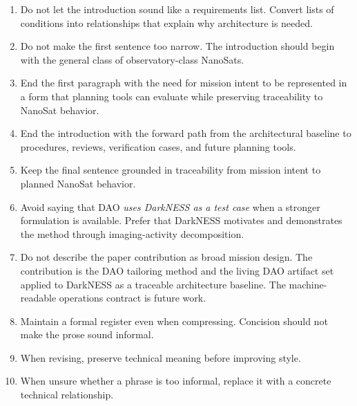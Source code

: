 \documentclass[11pt]{article}
\begin{document}
\begin{enumerate}
\item Do not let the introduction sound like a requirements list. Convert lists of conditions into relationships that explain why architecture is needed.

\item Do not make the first sentence too narrow. The introduction should begin with the general class of observatory-class NanoSats.

\item End the first paragraph with the need for mission intent to be represented in a form that planning tools can evaluate while preserving traceability to NanoSat behavior.

\item End the introduction with the forward path from the architectural baseline to procedures, reviews, verification cases, and future planning tools.

\item Keep the final sentence grounded in traceability from mission intent to planned NanoSat behavior.

\item Avoid saying that DAO \emph{uses DarkNESS as a test case} when a stronger formulation is available. Prefer that DarkNESS motivates and demonstrates the method through imaging-activity decomposition.

\item Do not describe the paper contribution as broad mission design. The contribution is the DAO tailoring method and the living DAO artifact set applied to DarkNESS as a traceable architecture baseline. The machine-readable operations contract is future work.

\item Maintain a formal register even when compressing. Concision should not make the prose sound informal.

\item When revising, preserve technical meaning before improving style.

\item When unsure whether a phrase is too informal, replace it with a concrete technical relationship.

\end{enumerate}
\end{document}
